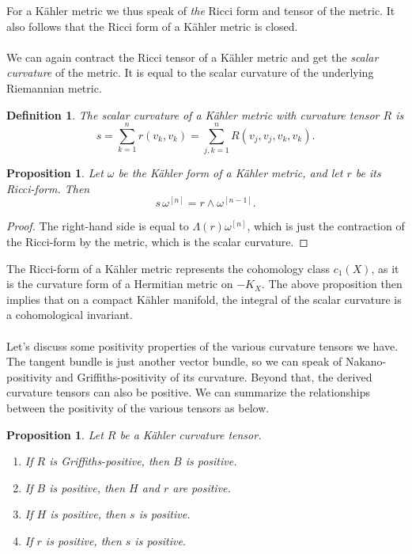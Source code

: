 \documentclass[10pt,a4paper]{article}
\newtheorem{prop}[theo]{Proposition}
\newtheorem{defi}[theo]{Definition}
\newtheorem*{proof}{Proof}
\def\^#1{^{[#1]}}
\begin{document}
For a K\"ahler metric we thus speak of \emph{the} Ricci form and tensor of the metric. It also follows that the Ricci form of a K\"ahler metric is closed.


\paragraph{}
We can again contract the Ricci tensor of a K\"ahler metric and get the \emph{scalar curvature} of the metric. It is equal to the scalar curvature of the underlying Riemannian metric.

\begin{defi}
The \emph{scalar curvature} of a K\"ahler metric with curvature tensor $R$ is
$$
s = \sum_{k=1}^n r(v_k,v_k) = \sum_{j,k=1}^n R(v_j,v_j,v_k,v_k).
$$
\end{defi}


\begin{prop}
Let $\omega$ be the K\"ahler form of a K\"ahler metric, and let $r$ be its Ricci-form. Then
$$
s \, \omega\^{n} = r \wedge \omega\^{n-1}.
$$
\end{prop}

\begin{proof}
The right-hand side is equal to $\Lambda(r) \omega\^n$, which is just the contraction of the Ricci-form by the metric, which is the scalar curvature.
\end{proof}

The Ricci-form of a K\"ahler metric represents the cohomology class $c_1(X)$, as it is the curvature form of a Hermitian metric on $-K_X$. The above proposition then implies that on a compact K\"ahler manifold, the integral of the scalar curvature is a cohomological invariant.



\paragraph{}

Let's discuss some positivity properties of the various curvature tensors we have. The tangent bundle is just another vector bundle, so we can speak of Nakano-positivity and Griffiths-positivity of its curvature. Beyond that, the derived curvature tensors can also be positive. We can summarize the relationships between the positivity of the various tensors as below.


\begin{prop}
\label{prop:derived-tensor-positivity}
  Let $R$ be a K\"ahler curvature tensor.
  \begin{enumerate}
    \item If $R$ is Griffiths-positive, then $B$ is positive.
    \item If $B$ is positive, then $H$ and $r$ are positive.
    \item If $H$ is positive, then $s$ is positive.
    \item If $r$ is positive, then $s$ is positive.
  \end{enumerate}
\end{prop}
\end{document}
